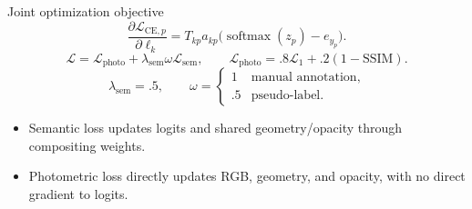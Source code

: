 \documentclass[aspectratio=169,10pt]{beamer}
\begin{document}
\begin{frame}{Joint optimization objective}
\small
\[\frac{\partial\mathcal L_{\mathrm{CE},p}}{\partial\ell_k}=T_{kp}a_{kp}\bigl(\operatorname{softmax}(z_p)-e_{y_p}\bigr).\]
\[\mathcal L=\mathcal L_{\mathrm{photo}}+\lambda_{\mathrm{sem}}\omega\mathcal L_{\mathrm{sem}},\qquad\mathcal L_{\mathrm{photo}}=.8\mathcal L_1+.2(1-\mathrm{SSIM}).\]
\[\lambda_{\mathrm{sem}}=.5,\qquad\omega=\begin{cases}1&\text{manual annotation},\\.5&\text{pseudo-label}.\end{cases}\]
\begin{itemize}\tightitems
\item Semantic loss updates logits and shared geometry/opacity through compositing weights.
\item Photometric loss directly updates RGB, geometry, and opacity, with no direct gradient to logits.
\end{itemize}
\end{frame}
\end{document}
